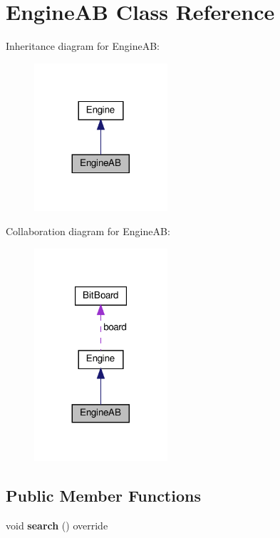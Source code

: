 \hypertarget{classEngineAB}{}\section{Engine\+AB Class Reference}
\label{classEngineAB}


Inheritance diagram for Engine\+AB\+:\nopagebreak
\begin{figure}[H]
\begin{center}
\leavevmode
\includegraphics[width=140pt]{classEngineAB__inherit__graph}
\end{center}
\end{figure}


Collaboration diagram for Engine\+AB\+:\nopagebreak
\begin{figure}[H]
\begin{center}
\leavevmode
\includegraphics[width=140pt]{classEngineAB__coll__graph}
\end{center}
\end{figure}
\subsection*{Public Member Functions}
\begin{DoxyCompactItemize}
\item 
\mbox{\label{classEngineAB_a21932dfac39f8e0d03c81454caa7c845}} 
void {\bfseries search} () override
\end{DoxyCompactItemize}
